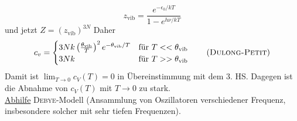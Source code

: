 \begin{enumerate}[A)]
    \begin{equation}
        z_\text{vib} = \frac{e^{-\epsilon_0 / kT}}{1-e^{h \nu / kT}}
    \end{equation}
    und jetzt $Z = \left( z_\text{vib} \right)^{3N}$
    Daher
    \begin{equation}
        c_v =
        \begin{cases}
            3 N k \left( \frac{\theta_\text{vib}}{T} \right)^2 e^{- \theta_\text{vib} / T} & \text{für } T << \theta_\text{vib} \\
            3 N k & \text{für } T >> \theta_\text{vib}
        \end{cases}
        \qquad \left( \text{\textsc{Dulong-Petit}} \right) 
    \end{equation}
    Damit ist $\lim_{T \to 0} c_V(T) = 0$ in Übereinstimmung mit dem 3. HS. Dagegen ist die Abnahme von $c_V(T)$ mit $T \to 0$ zu stark.\\
    \underline{Abhilfe} \textsc{Debye}-Modell (Ansammlung von Oszillatoren verschiedener Frequenz, insbesondere solcher mit sehr tiefen Frequenzen).
\end{enumerate}

